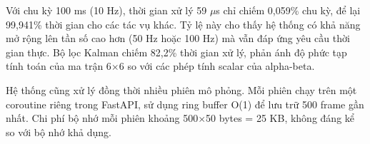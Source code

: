 Với chu kỳ 100 ms (10 Hz), thời gian xử lý 59 $\mu$s chỉ chiếm 0,059\% chu kỳ, để lại 99,941\% thời gian cho các tác vụ khác. Tỷ lệ này cho thấy hệ thống có khả năng mở rộng lên tần số cao hơn (50 Hz hoặc 100 Hz) mà vẫn đáp ứng yêu cầu thời gian thực. Bộ lọc Kalman chiếm 82,2\% thời gian xử lý, phản ánh độ phức tạp tính toán của ma trận 6$\times$6 so với các phép tính scalar của alpha-beta.

Hệ thống cũng xử lý đồng thời nhiều phiên mô phỏng. Mỗi phiên chạy trên một coroutine riêng trong FastAPI, sử dụng ring buffer O(1) để lưu trữ 500 frame gần nhất. Chi phí bộ nhớ mỗi phiên khoảng 500$\times$50 bytes = 25 KB, không đáng kể so với bộ nhớ khả dụng.
